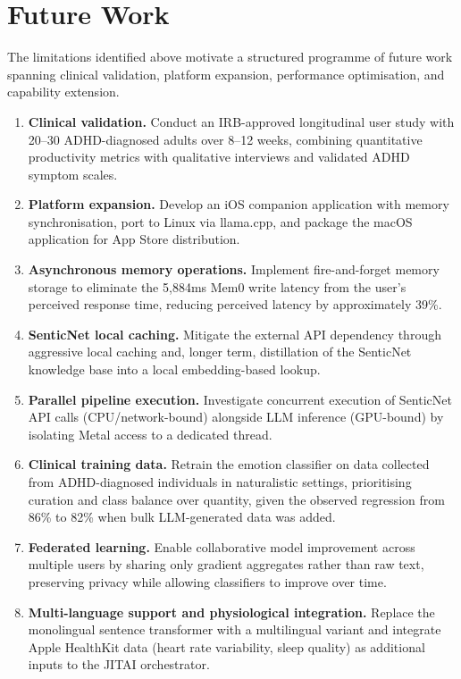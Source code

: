 \section{Future Work}
\label{sec:future-work}

The limitations identified above motivate a structured programme of future work spanning clinical validation, platform expansion, performance optimisation, and capability extension.

\begin{enumerate}
    \item \textbf{Clinical validation.} Conduct an IRB-approved longitudinal user study with 20--30 ADHD-diagnosed adults over 8--12 weeks, combining quantitative productivity metrics with qualitative interviews and validated ADHD symptom scales.

    \item \textbf{Platform expansion.} Develop an iOS companion application with memory synchronisation, port to Linux via llama.cpp, and package the macOS application for App Store distribution.

    \item \textbf{Asynchronous memory operations.} Implement fire-and-forget memory storage to eliminate the 5,884ms Mem0 write latency from the user's perceived response time, reducing perceived latency by approximately 39\%.

    \item \textbf{SenticNet local caching.} Mitigate the external API dependency through aggressive local caching and, longer term, distillation of the SenticNet knowledge base into a local embedding-based lookup.

    \item \textbf{Parallel pipeline execution.} Investigate concurrent execution of SenticNet API calls (CPU/network-bound) alongside LLM inference (GPU-bound) by isolating Metal access to a dedicated thread.

    \item \textbf{Clinical training data.} Retrain the emotion classifier on data collected from ADHD-diagnosed individuals in naturalistic settings, prioritising curation and class balance over quantity, given the observed regression from 86\% to 82\% when bulk LLM-generated data was added.

    \item \textbf{Federated learning.} Enable collaborative model improvement across multiple users by sharing only gradient aggregates rather than raw text, preserving privacy while allowing classifiers to improve over time.

    \item \textbf{Multi-language support and physiological integration.} Replace the monolingual sentence transformer with a multilingual variant and integrate Apple HealthKit data (heart rate variability, sleep quality) as additional inputs to the JITAI orchestrator.
\end{enumerate}

